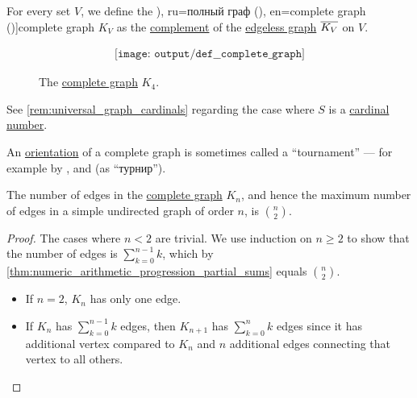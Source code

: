 \begin{definition}\label{def:complete_graph}\mimprovised
  For every set \( V \), we define the \term[bg=пълен граф (\cite[12]{Мирчев2001Графи}), ru=полный граф (\cite[10]{ЕмеличевИПр1990ТеорияГрафов}), en=complete graph (\cite[def. 1.3.1]{Knauer2019AlgebraicGraphTheory})]{complete graph} \( K_V \) as the \hyperref[def:graph_complement]{complement} of the \hyperref[def:edgeless_graph]{edgeless graph} \( \oline{K_V} \) on \( V \).

  \begin{figure}[!ht]
    \begin{equation}\label{eq:fig:def:complete_graph/k4}
      \begin{aligned}
        \texttt{[image: output/def\_\_complete\_graph]}
      \end{aligned}
    \end{equation}
    \caption{The \hyperref[def:complete_graph]{complete graph} \( K_4 \).}\label{fig:def:complete_graph/k4}
  \end{figure}
\end{definition}
\begin{comments}
  \item See \cref{rem:universal_graph_cardinals} regarding the case where \( S \) is a \hyperref[def:cardinal]{cardinal number}.

  \item An \hyperref[def:multigraph_orientation]{orientation} of a complete graph is sometimes called a \enquote{tournament} --- for example by ,  and  (as \enquote{турнир}).
\end{comments}

\begin{proposition}\label{thm:complete_graph_edge_count}
  The number of edges in the \hyperref[def:complete_graph]{complete graph} \( K_n \), and hence the maximum number of edges in a simple undirected graph of order \( n \), is \( \binom n 2 \).
\end{proposition}
\begin{proof}
  The cases where \( n < 2 \) are trivial. We use induction on \( n \geq 2 \) to show that the number of edges is \( \sum_{k=0}^{n-1} k \), which by \cref{thm:numeric_arithmetic_progression_partial_sums} equals \( \binom n 2 \).

  \begin{itemize}
    \item If \( n = 2 \), \( K_n \) has only one edge.
    \item If \( K_n \) has \( \sum_{k=0}^{n-1} k \) edges, then \( K_{n+1} \) has \( \sum_{k=0}^n k \) edges since it has additional vertex compared to \( K_n \) and \( n \) additional edges connecting that vertex to all others.
  \end{itemize}
\end{proof}

